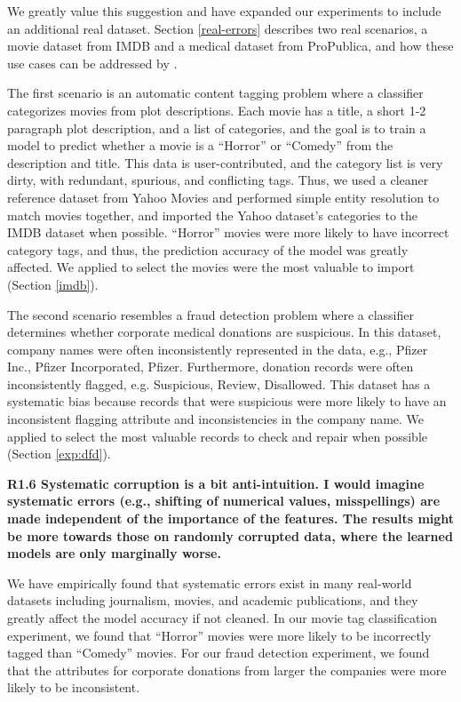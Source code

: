 \noindent We greatly value this suggestion and have expanded our experiments to include an additional real dataset.
Section \ref{real-errors} describes two real scenarios, a movie dataset from IMDB and a medical dataset from ProPublica, and how these use cases can be addressed by \sys.

The first scenario is an automatic content tagging problem where a classifier categorizes movies from plot descriptions.
Each movie has a title, a short 1-2 paragraph plot description, and a list of categories, and the goal is to train a model to predict whether a movie is a ``Horror'' or ``Comedy'' from the description and title. 
This data is user-contributed, and the category list is very dirty, with redundant, spurious, and conflicting tags.  
Thus, we used a cleaner reference dataset from Yahoo Movies and performed simple entity resolution to match movies together, and imported the Yahoo dataset's categories to the IMDB dataset when possible.
``Horror'' movies were more likely to have incorrect category tags, and thus, the prediction accuracy of the model was greatly affected. 
We applied \sys to select the movies were the most valuable to import (Section \ref{imdb}). 

The second scenario resembles a fraud detection problem where a classifier determines whether corporate medical donations are suspicious.
In this dataset, company names were often inconsistently represented in the data, e.g., Pfizer Inc., Pfizer Incorporated, Pfizer.
Furthermore, donation records were often inconsistently flagged, e.g. Suspicious, Review, Disallowed.
This dataset has a systematic bias because records that were suspicious were more likely to have an inconsistent flagging attribute and inconsistencies in the company name.
We applied \sys to select the most valuable records to check and repair when possible (Section \ref{exp:dfd}). 

\vspace{0.5em}

\noindent\textbf{R1.6 Systematic corruption is a bit anti-intuition. I would imagine systematic errors (e.g., shifting of numerical values, misspellings) are made independent of the importance of the features. The results might be more towards those on randomly corrupted data, where the learned models are only marginally worse.}

\noindent  We have empirically found that systematic errors exist in many real-world datasets including journalism, movies, and academic publications, and they greatly affect the model accuracy if not cleaned. In our movie tag classification experiment, we found that ``Horror'' movies were more likely to be incorrectly tagged than ``Comedy'' movies.
For our fraud detection experiment, we found that the attributes for corporate donations from larger the companies were more likely to be inconsistent.

